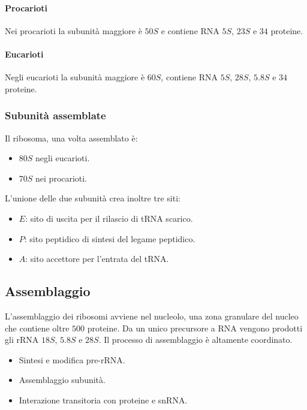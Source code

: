 			\paragraph{Procarioti}
			Nei procarioti la subunit\`a maggiore \`e $50S$ e contiene RNA $5S$, $23S$ e $34$ proteine.

			\paragraph{Eucarioti}
			Negli eucarioti la subunit\`a maggiore \`e $60S$, contiene RNA $5S$, $28S$, $5.8S$ e $34$ proteine.

		\subsubsection{Subunit\`a assemblate}
		Il ribosoma, una volta assemblato \`e:
		\begin{multicols}{2}
			\begin{itemize}
				\item $80S$ negli eucarioti.
				\item $70S$ nei procarioti.
			\end{itemize}
		\end{multicols}
		L'unione delle due subunit\`a crea inoltre tre siti:
		\begin{multicols}{3}
			\begin{itemize}
				\item $E$: sito di uscita per il rilascio di tRNA scarico.
				\item $P$: sito peptidico di sintesi del legame peptidico.
				\item $A$: sito accettore per l'entrata del tRNA.
			\end{itemize}
		\end{multicols}


	\subsection{Assemblaggio}
	L'assemblaggio dei ribosomi avviene nel nucleolo, una zona granulare del nucleo che contiene oltre $500$ proteine.
	Da un unico precursore a RNA vengono prodotti gli rRNA $18S$, $5.8S$ e $28S$.
	Il processo di assemblaggio \`e altamente coordinato.
	\begin{multicols}{2}
		\begin{itemize}
			\item Sintesi e modifica pre-rRNA.
			\item Assemblaggio subunit\`a.
			\item Interazione transitoria con proteine e snRNA.
		\end{itemize}
	\end{multicols}


